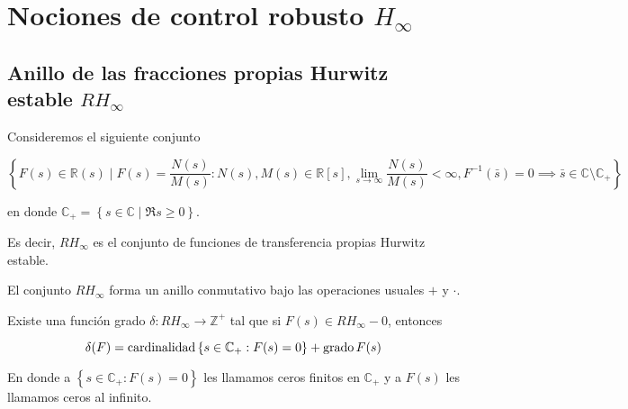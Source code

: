 
\chapter{Nociones de control robusto $H_{\infty}$}


    \section{Anillo de las fracciones propias Hurwitz estable $RH_{\infty}$}

        Consideremos el siguiente conjunto

        \begin{equation}
            \left\{ F(s) \in \mathbb{R}(s) \mid F(s) = \frac{N(s)}{M(s)} : N(s), M(s) \in \mathbb{R}[s], \lim_{s \to \infty} \frac{N(s)}{M(s)} < \infty, F^{-1}(\bar{s}) = 0 \implies \bar{s} \in \mathbb{C} \setminus \mathbb{C}_+ \right\}
        \end{equation}

        en donde $\mathbb{C}_+ = \left\{ s \in \mathbb{C} \mid \Re{s} \ge 0 \right\}$.

        Es decir, $RH_{\infty}$ es el conjunto de funciones de transferencia propias Hurwitz estable.

        \begin{definicion}
            El conjunto $RH_{\infty}$ forma un anillo conmutativo bajo las operaciones usuales $+$ y $\cdot$.
        \end{definicion}

        \begin{definicion}
            Existe una función grado $\delta: RH_{\infty} \to \mathbb{Z}^+$ tal que si $F(s) \in RH_{\infty} - {0}$, entonces

            \begin{equation}
                \delta(F) = \operatorname{cardinalidad}{\left\{ s \in \mathbb{C}_+ : F(s) = 0 \right\}} + \operatorname{grado}{F(s)}
            \end{equation}

            En donde a $\left\{ s \in \mathbb{C}_+ : F(s) = 0 \right\}$ les llamamos ceros finitos en $\mathbb{C}_+$ y a $F(s)$ les llamamos ceros al infinito.
        \end{definicion}

